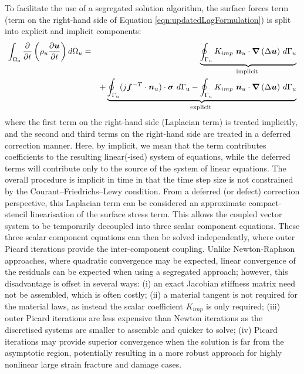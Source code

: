 \documentclass[sn-mathphys,Numbered]{sn-jnl}%
\newcommand{\bb}{\boldsymbol}
\begin{document}
To facilitate the use of a segregated solution algorithm, the surface forces term (term on the right-hand side of Equation \ref{eqn:updatedLagFormulation}) is split into explicit and implicit components:
\begin{eqnarray} \label{eqn:MomentumImplicitExplicit}
	\int_{\mathrm{\Omega_u}} \frac{\partial }{\partial t} \left( \rho_u \frac{\partial \bb{u} }{\partial t} \right) d\mathrm{\Omega}_u
	&=&
	\underbrace{\oint_{\mathrm{\Gamma}_u}{K_{imp}\  \bb{n}_u\cdot\bb{\nabla}\left(\Delta \bb{u} \right)}\ d\mathrm{\Gamma}_u}_{\text {implicit }} \notag \\
    &&+
    \underbrace{
    \oint_{\mathrm{\Gamma_u}}(j\bb{f}^{-T}\cdot{\bb{n}_u) \cdot \boldsymbol{\sigma}}\ d\mathrm{\Gamma_u}
    - 
    \oint_{\mathrm{\Gamma}_u}{K_{imp}\ 
 \bb{n}_u \cdot \bb{\nabla}\left(\Delta \bb{u}\right)}\ d\Gamma_u
 }_{\text {explicit }}  %
\end{eqnarray}
where the first term on the right-hand side (Laplacian term) is treated implicitly, and the second and third terms on the right-hand side are treated in a deferred correction manner.
Here, by implicit, we mean that the term contributes coefficients to the resulting linear(-ised) system of equations, while the deferred terms will contribute only to the source of the system of linear equations.
The overall procedure is implicit in time in that the time step size is not constrained by the Courant–Friedrichs–Lewy condition.
From a deferred (or defect) correction perspective, this Laplacian term can be considered an approximate compact-stencil linearisation of the surface stress term.
This allows the coupled vector system to be temporarily decoupled into three scalar component equations.
These three scalar component equations can then be solved independently, where outer Picard iterations provide the inter-component coupling.
Unlike Newton-Raphson approaches, where quadratic convergence may be expected, linear convergence of the residuals can be expected when using a segregated approach; however, this disadvantage is offset in several ways: (i) an exact Jacobian stiffness matrix need not be assembled, which is often costly; (ii) a material tangent is not required for the material laws, as instead the scalar coefficient $K_{imp}$ is only required; (iii) outer Picard iterations are less expensive than Newton iterations as the discretised systems are smaller to assemble and quicker to solve; (iv) Picard iterations may provide superior convergence when the solution is far from the asymptotic region, potentially resulting in a more robust approach for highly nonlinear large strain fracture and damage cases.
\end{document}
